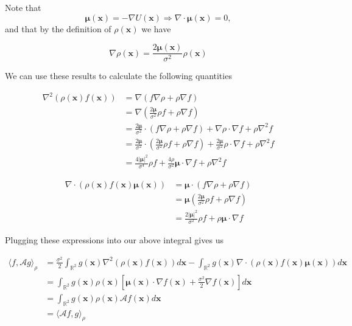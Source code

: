 \documentclass[12pt, a4paper]{article}
\begin{document}
\begin{enumerate}
\begin{enumerate}
        Note that $$\boldsymbol \mu (\mathbf x) = - \nabla U(\mathbf x) \Rightarrow \nabla \cdot \boldsymbol \mu(\mathbf x)=0,$$ and that by the definition of $\rho(\mathbf x)$ we have

        $$\nabla \rho(\mathbf x) = \frac{2 \boldsymbol \mu(\mathbf x)}{\sigma^2} \rho(\mathbf x)$$

        We can use these results to calculate the following quantities

        \begin{align*}
            \nabla^2(\rho(\mathbf x) f(\mathbf x)) &= \nabla(f \nabla \rho + \rho \nabla f)\\
            &= \nabla\left(\frac{2\boldsymbol \mu}{\sigma^2} \rho f + \rho \nabla f\right) \\
            &= \frac{2\boldsymbol \mu}{\sigma^2} \cdot (f \nabla \rho + \rho \nabla f) +\nabla \rho \cdot \nabla f + \rho \nabla^2 f \\
            &= \frac{2\boldsymbol \mu}{\sigma^2} \cdot \left( \frac{2 \boldsymbol \mu }{\sigma^2} \rho f + \rho \nabla f \right) + \frac{2\boldsymbol \mu }{\sigma^2} \rho \cdot \nabla f + \rho  \nabla^2 f \\
            &= \frac{4 |\boldsymbol \mu|^2}{\sigma^4}\rho f + \frac{4 \rho}{\sigma^2}\boldsymbol \mu \cdot \nabla f + \rho \nabla^2 f
        \end{align*}

        \begin{align*}
            \nabla \cdot (\rho(\mathbf x)f(\mathbf x)\boldsymbol \mu(\mathbf x)) &= \boldsymbol \mu \cdot (f\nabla \rho + \rho \nabla f) \\
            &= \boldsymbol \mu \left( \frac{2\boldsymbol \mu}{\sigma^2} \rho f + \rho \nabla f \right) \\
            &= \frac{2 |\boldsymbol \mu|^2}{\sigma^2} \rho f + \rho \boldsymbol \mu \cdot \nabla f
        \end{align*}

        Plugging these expressions into our above integral gives us 

        \begin{align*}
            \langle f, \mathcal A g \rangle_\rho &= \frac{\sigma^2}{2} \int_{\mathbb R^2}g(\mathbf x) \nabla^2 \left( \rho(\mathbf x) f(\mathbf x) \right) d\mathbf x - \int_{\mathbb R^2} g(\mathbf x) \nabla \cdot \left( \rho(\mathbf x) f(\mathbf x) \boldsymbol \mu (\mathbf x) \right) d\mathbf x \\
            &= \int_{\mathbb R^2} g(\mathbf x) \rho(\mathbf x) \left[\boldsymbol \mu(\mathbf x) \cdot \nabla f(\mathbf x) + \frac{\sigma^2}{2} \nabla f(\mathbf x) \right]d\mathbf x \\
            &= \int_{\mathbb R^2} g(\mathbf x) \rho(\mathbf x) \mathcal A f(\mathbf x)d\mathbf x \\
            &= \langle \mathcal A f, g\rangle_\rho
        \end{align*}


\end{enumerate}
\end{enumerate}
\end{document}

